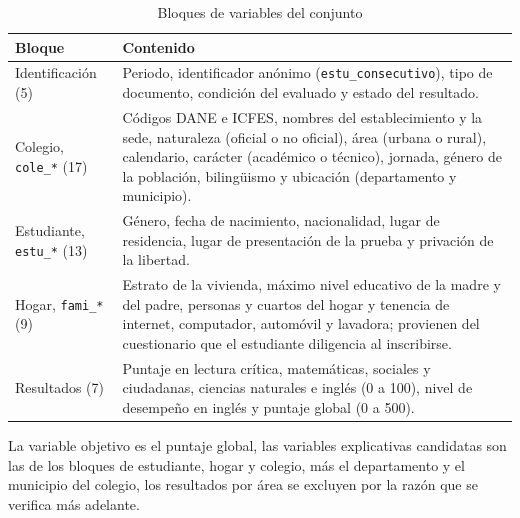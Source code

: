         \begin{table}[H]
            \centering
            \caption{Bloques de variables del conjunto}
            \label{variables}
            \begin{tabular}{|L{2.3cm}|L{5.4cm}|}
                \hline
                \textbf{Bloque} & \textbf{Contenido} \\
                \hline
                Identificación (5) & Periodo, identificador anónimo
                (\texttt{estu\_consecutivo}), tipo de documento, condición del
                evaluado y estado del resultado. \\
                \hline
                Colegio, \texttt{cole\_*} (17) & Códigos DANE e ICFES, nombres
                del establecimiento y la sede, naturaleza (oficial o no oficial),
                área (urbana o rural), calendario, carácter (académico o técnico),
                jornada, género de la población, bilingüismo y ubicación
                (departamento y municipio). \\
                \hline
                Estudiante, \texttt{estu\_*} (13) & Género, fecha de nacimiento,
                nacionalidad, lugar de residencia, lugar de presentación de la
                prueba y privación de la libertad. \\
                \hline
                Hogar, \texttt{fami\_*} (9) & Estrato de la vivienda, máximo
                nivel educativo de la madre y del padre, personas y cuartos del
                hogar y tenencia de internet, computador, automóvil y lavadora;
                provienen del cuestionario que el estudiante diligencia al
                inscribirse. \\
                \hline
                Resultados (7) & Puntaje en lectura crítica, matemáticas,
                sociales y ciudadanas, ciencias naturales e inglés (0 a 100),
                nivel de desempeño en inglés y puntaje global (0 a 500). \\
                \hline
            \end{tabular}
        \end{table}

        La variable objetivo es el puntaje global, las variables explicativas
        candidatas son las de los bloques de estudiante, hogar y colegio, más 
        el departamento y el municipio del colegio, los resultados por área se
        excluyen por la razón que se verifica más adelante.
